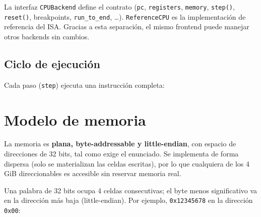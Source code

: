 \documentclass[11pt]{article}
\begin{document}
\noindent
La interfaz \texttt{CPUBackend} define el contrato (\texttt{pc}, \texttt{registers},
\texttt{memory}, \texttt{step()}, \texttt{reset()}, breakpoints, \texttt{run\_to\_end}, \dots).
\texttt{ReferenceCPU} es la implementación de referencia del ISA. Gracias a esta
separación, el mismo frontend puede manejar otros backends sin cambios.

\subsection*{Ciclo de ejecución}

Cada paso (\texttt{step}) ejecuta una instrucción completa:

\begin{center}
\end{center}

\section{Modelo de memoria}

La memoria es \textbf{plana, byte-addressable y little-endian}, con espacio de
direcciones de 32 bits, tal como exige el enunciado. Se implementa de forma
dispersa (solo se materializan las celdas escritas), por lo que cualquiera de los
4\,GiB direccionables es accesible sin reservar memoria real.

Una palabra de 32 bits ocupa 4 celdas consecutivas; el byte menos significativo
va en la dirección más baja (little-endian). Por ejemplo, \texttt{0x12345678} en
la dirección \texttt{0x00}:

\begin{center}
\end{center}
\end{document}

